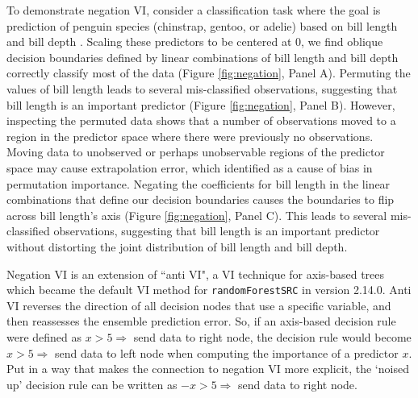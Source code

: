 \documentclass[12pt]{article}\usepackage[]{graphicx}\usepackage[]{xcolor}
\begin{document}
To demonstrate negation VI, consider a classification task where the goal is prediction of penguin species (chinstrap, gentoo, or adelie) based on bill length and bill depth \citep{palmerpenguins_rpack}. Scaling these predictors to be centered at 0, we find oblique decision boundaries defined by linear combinations of bill length and bill depth correctly classify most of the data (Figure \ref{fig:negation}, Panel A). Permuting the values of bill length leads to several mis-classified observations, suggesting that bill length is an important predictor (Figure \ref{fig:negation}, Panel B). However, inspecting the permuted data shows that a number of observations moved to a region in the predictor space where there were previously no observations. Moving data to unobserved or perhaps unobservable regions of the predictor space may cause extrapolation error, which \citet{hooker2021unrestricted} identified as a cause of bias in permutation importance. Negating the coefficients for bill length in the linear combinations that define our decision boundaries causes the boundaries to flip across bill length's axis (Figure \ref{fig:negation}, Panel C). This leads to several mis-classified observations, suggesting that bill length is an important predictor without distorting the joint distribution of bill length and bill depth.

Negation VI is an extension of ``anti VI", a VI technique for axis-based trees which became the default VI method for \texttt{randomForestSRC} in version 2.14.0. Anti VI reverses the direction of all decision nodes that use a specific variable, and then reassesses the ensemble prediction error. So, if an axis-based decision rule were defined as $x > 5 \Rightarrow$ send data to right node, the decision rule would become $x > 5 \Rightarrow$ send data to left node when computing the importance of a predictor $x$. Put in a way that makes the connection to negation VI more explicit, the `noised up' decision rule can be written as $-x > 5 \Rightarrow$ send data to right node.
\end{document}
